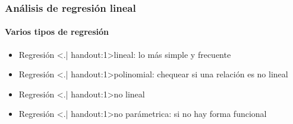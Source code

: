 \documentclass[mathserif]{beamer}
\begin{document}
\begin{frame}[label=linreg3]
   \frametitle{An\'alisis de regresi\'on lineal}
   \framesubtitle{Varios tipos de regresi\'on }
   \begin{itemize}
      \item Regresi\'on \structure<.| handout:1>{lineal}: lo m\'as simple y frecuente
      \item Regresi\'on \structure<.| handout:1>{polinomial}: chequear si una relaci\'on es no lineal
      \item Regresi\'on \structure<.| handout:1>{no lineal}
      \item Regresi\'on \structure<.| handout:1>{no par\'ametrica}: si no hay forma funcional
   \end{itemize}
\end{frame}%
\end{document}
